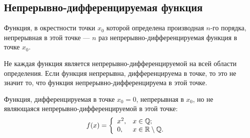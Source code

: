 \subsection{Непрерывно-дифференцируемая функция}
\begin{definition} 
Функция, в окрестности точки \( x_0 \) которой определена производная \( n \)-го порядка, непрерывная в этой точке --- \( n \) раз непрерывно-дифференцируемая функция в точке \( x_0 \).
\end{definition}
Не каждая функция является непрерывно-дифференцируемой на всей области определения. Если функция непрерывна, дифференцируема в точке, то это не значит то, что функция непрерывно-дифференцируема в этой точке.
\begin{example} Функция, дифференцируемая в точке \( x_0 = 0 \), непрерывная в \( x_0 \), но не являющаяся непрерывно-дифференцируемой в этой точке: 
\[ 
    f(x) = \left\{ \begin{array}{ll}
        x^2, & x \in \mathbb{Q}; \\
        0,   & x \in \mathbb{R} \setminus \mathbb{Q}.
    \end{array} \right.
\]
\end{example} %
